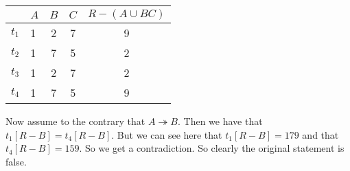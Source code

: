 \documentclass{article}
\begin{document}
\begin{tabular}{ | l | l | c | c | c | }
  \hline
    & $A$ & $B$ & $C$ & $R - (A \cup BC)$ \\ \hline
  $t_1$ & 1 & 2 & 7 & 9 \\
  $t_2$ & 1 & 7 & 5 & 2 \\
  $t_3$ & 1 & 2 & 7 & 2 \\
  $t_4$ & 1 & 7 & 5 & 9 \\
  \hline
\end{tabular}

Now assume to the contrary that $A \twoheadrightarrow B$. Then we have that
$t_1[R - B] = t_4[R - B]$. But we can see here that $t_1[R - B] = 179$ and
that $t_4[R - B] = 159$. So we get a contradiction. So clearly
the original statement is false.

\end{document}
